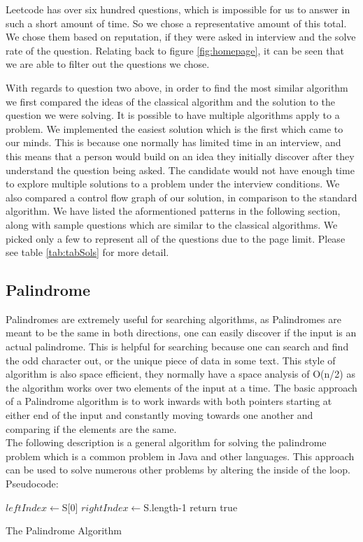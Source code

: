 \documentclass[10pt,twocolumn]{IEEEtran}
\begin{document}
\par Leetcode has over six hundred questions, which is impossible for us to answer in such a short amount of time. So we chose a representative amount of this total. We chose them based on reputation, if they were asked in interview and the solve rate of the question. Relating back to figure \ref{fig:homepage}, it can be seen that we are able to filter out the questions we chose.
\par With regards to question two above, in order to find the most similar algorithm we first compared the ideas of the classical algorithm and the solution to the question we were solving. It is possible to have multiple algorithms apply to a problem. We implemented the easiest solution which is the first which came to our minds. This is because one normally has limited time in an interview, and this means that a person would build on an idea they initially discover after they understand the question being asked. The candidate would not have enough time to explore multiple solutions to a problem under the interview conditions. We also compared a control flow graph of our solution, in comparison to the standard algorithm. We have listed the aformentioned patterns in the following section, along with sample questions which are similar to the classical algorithms. We picked only a few to represent all of the questions due to the page limit. Please see table \ref{tab:tabSols} for more detail.  	 
\subsection{Palindrome}
Palindromes are extremely useful for searching algorithms, as Palindromes are meant to be the same in both directions, one can easily discover if the input is an actual palindrome. This is helpful for searching because one can search and find the odd character out, or the unique piece of data in some text. This style of algorithm is also space efficient, they normally have a space analysis of O(n/2) as the algorithm works over two elements of the input at a time. The basic approach of a Palindrome algorithm is to work inwards with both pointers starting at either end of the input and constantly moving towards one another and comparing if the elements are the same.\\  
The following description is a general algorithm for solving the palindrome problem which is a common problem in Java and other languages. This approach can be used to solve numerous other problems by altering the inside of the loop.
Pseudocode:
\IncMargin{1em}
\begin{algorithm}
	\SetAlgoLined
	$leftIndex  \longleftarrow $S[0]\;
	$rightIndex \longleftarrow $S.length-1\;
return true\;
\caption{The Palindrome Algorithm}
\end{algorithm}\DecMargin{1em}
\end{document}
